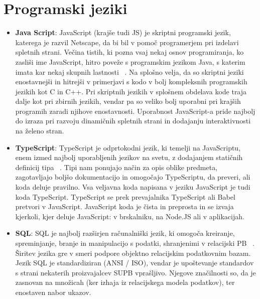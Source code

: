 \documentclass[a4paper, 12pt]{book}
\begin{document}
\section{Programski jeziki}
 \begin{itemize}
  \item \textbf{Java Script}: JavaScript (krajše tudi JS) je skriptni programski jezik, katerega je razvil Netscape, da bi bil v pomoč programerjem pri izdelavi spletnih strani. Večina tistih, ki pozna vsaj nekaj osnov programiranja, ko zasliši ime JavaScript, hitro poveže s programskim jezikom Java, s katerim imata kar nekaj skupnih lastnosti  ~\cite{JS}. Na splošno velja, da so skriptni jeziki enostavnejši in hitrejši v primerjavi s kodo v bolj kompleksnih programskih jezikih kot C in C++. Pri skriptnih jezikih v splošnem obdelava kode traja dalje kot pri zbirnih jezikih, vendar pa so veliko bolj uporabni pri krajših programih zaradi njihove enostavnosti. Uporabnost JavaScript-a pride najbolj do izraza pri razvoju dinamičnih spletnih strani in dodajanju interaktivnosti na želeno stran.
  
  \item \textbf{TypeScript}: TypeScript je odprtokodni jezik, ki temelji na JavaScriptu, enem izmed najbolj uporabljenih jezikov na svetu, z dodajanjem statičnih definicij tipa ~\cite{TS}. Tipi nam ponujajo način za opis oblike predmeta, zagotavljajo boljšo dokumentacijo in omogočajo TypeScriptu, da preveri, ali koda deluje pravilno.
Vsa veljavna koda napisana v jeziku JavaScript je tudi koda TypeScript. TypeScript se prek prevajalnika TypeScript ali Babel pretvori v JavaScript. JavaScript koda je čista in preprosta in se izvaja kjerkoli, kjer deluje JavaScript: v brskalniku, na Node.JS ali v aplikacijah.
  
  \item \textbf{SQL}: SQL je najbolj razširjen računalniški jezik, ki omogoča kreiranje, spreminjanje, branje in manipulacijo s podatki, shranjenimi v relacijski PB ~\cite{SQL}. Širitev jezika gre v smeri podpore objektno relacijskim podatkovnim bazam. Jezik SQL je standardiziran (ANSI / ISO), vendar je upoštevanje standardov s strani nekaterih proizvajalcev SUPB vprašljivo. Njegove značilnosti so, da je zasnovan na množicah (ker izhaja iz relacijskega modela podatkov), ter enostaven nabor ukazov.
\end{itemize}
\end{document}
